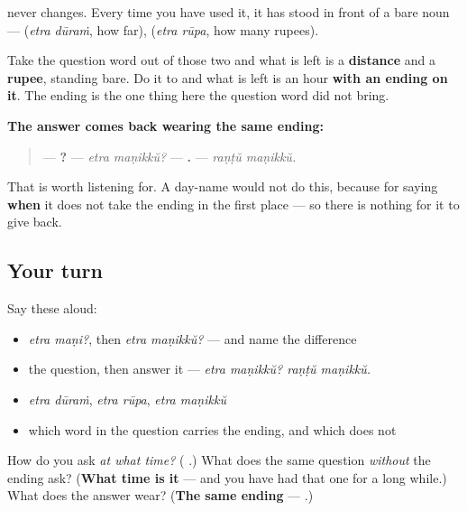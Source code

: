 \begin{grammarlens}[title={Grammar Lens: which word wears the ending}]
\textbf{} never changes. Every time you have used it, it has stood in front of a bare noun — \textbf{ } (\emph{etra dūraṁ}, how far), \textbf{ } (\emph{etra rūpa}, how many rupees).

Take the question word out of those two and what is left is a \textbf{distance} and a \textbf{rupee}, standing bare. Do it to \textbf{ } and what is left is an hour \textbf{with an ending on it}. The ending is the one thing here the question word did not bring.
\end{grammarlens}

\begin{culture}
\textbf{The answer comes back wearing the same ending:}

\begin{quote}
— \textbf{ ?} — \emph{etra maṇikkŭ?} — \textbf{ .} — \emph{raṇṭŭ maṇikkŭ.}
\end{quote}

That is worth listening for. A day-name would not do this, because for saying \textbf{when} it does not take the ending in the first place — so there is nothing for it to give back.
\end{culture}

\subsection*{Your turn}
Say these aloud:

\begin{itemize}
\raggedright
  \item \emph{etra maṇi?}, then \emph{etra maṇikkŭ?} — and name the difference
  \item the question, then answer it — \emph{etra maṇikkŭ? raṇṭŭ maṇikkŭ.}
  \item \emph{etra dūraṁ}, \emph{etra rūpa}, \emph{etra maṇikkŭ}
  \item which word in the question carries the ending, and which does not
\end{itemize}

\begin{tcolorbox}[breakable,colback=teal!4,colframe=teal!35!black,title={Before you move on}]
How do you ask \emph{at what time?} (\textbf{ }.) What does the same question \emph{without} the ending ask? (\textbf{What time is it} — and you have had that one for a long while.) What does the answer wear? (\textbf{The same ending} —  .)
\end{tcolorbox}
